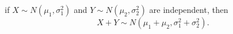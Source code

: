 %
%
%


\begin{theorem}\label{thm:sum_of_normal_variables}
if $X\sim N(\mu_1,\sigma_1^2)$ and $Y\sim N(\mu_2,\sigma_2^2)$ are independent, then
\[
X+Y\sim N(\mu_1+\mu_2, \sigma_1^2+\sigma_2^2).
\]
\end{theorem}

